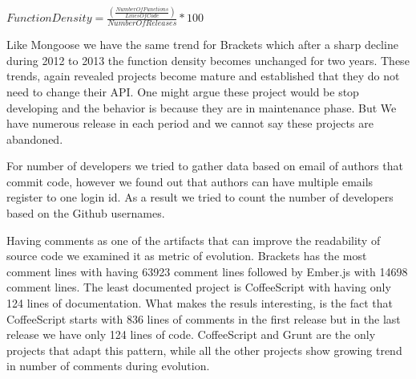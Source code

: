 \begin{center}
	$Function Density=  \frac{\left ( \frac{Number Of Functions}{Lines Of Code} \right)}{Number Of Releases}\ast 100$
\end{center}

\par
Like Mongoose we have the same trend for Brackets which after a sharp decline during 2012 to 2013 the function density becomes unchanged for two years. These trends, again revealed projects become mature and established that they do not need to change their API. One might argue these project would be stop developing and the behavior is because they are in maintenance phase. But We have numerous release in each period and we cannot say these projects are abandoned.  
 


\par For number of developers we tried to gather data based on email of authors that commit code, however we found out that authors can have multiple emails register to one login id. As a result we tried to count the number of developers based on the Github usernames. 


\par
Having comments as one of the artifacts that can improve the readability of source code we examined it as metric of evolution.
Brackets has the most comment lines with having 63923 comment lines followed by Ember.js with 14698 comment lines. The least documented project is CoffeeScript with having only 124 lines of documentation. What makes the resuls interesting, is the fact that CoffeeScript starts with 836 lines of comments in the first release but in the last release we have only 124 lines of code. CoffeeScript and Grunt are the only projects that adapt this pattern, while all the other projects show growing trend in number of comments during evolution.  


